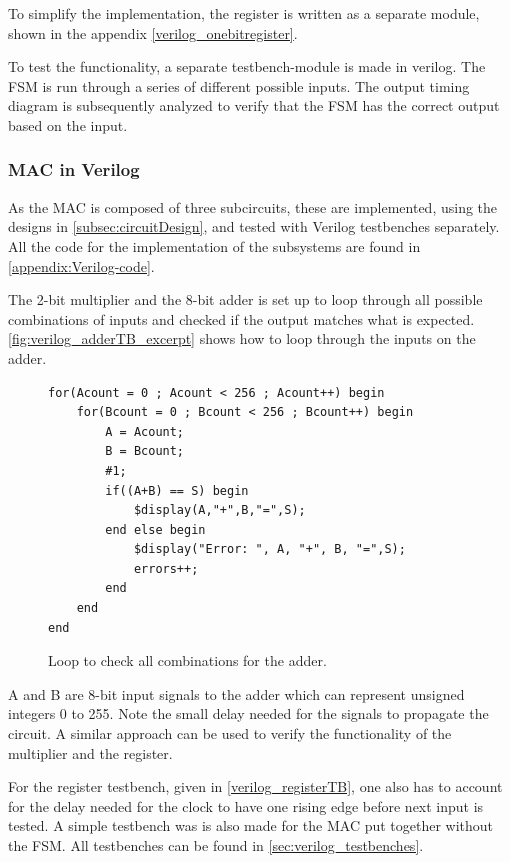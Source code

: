 To simplify the implementation, the register is written as a separate module, shown in the appendix \autoref{verilog_onebitregister}.

To test the functionality, a separate testbench-module is made in verilog. The FSM is run through a series of different possible inputs. The output timing diagram is subsequently analyzed to verify that the FSM has the correct output based on the input.

\subsubsection{MAC in Verilog}
\label{subsubsec:MAC_in_verilog}

As the MAC is composed of three subcircuits, these are implemented, using the designs in \autoref{subsec:circuitDesign}, and tested with Verilog testbenches separately. All the code for the implementation of the subsystems are found in \autoref{appendix:Verilog-code}. 

The 2-bit multiplier and the 8-bit adder is set up to loop through all possible combinations of inputs and checked if the output matches what is expected. \autoref{fig:verilog_adderTB_excerpt} shows how to loop through the inputs on the adder.

\begin{figure}[H]
\centering
\caption{Loop to check all combinations for the adder.}
\label{fig:verilog_adderTB_excerpt}
\begin{minipage}{0.8\textwidth}
\begin{lstlisting}[style=verilogStyle]
for(Acount = 0 ; Acount < 256 ; Acount++) begin
    for(Bcount = 0 ; Bcount < 256 ; Bcount++) begin
        A = Acount;
        B = Bcount;
        #1;
        if((A+B) == S) begin
            $display(A,"+",B,"=",S);
        end else begin
            $display("Error: ", A, "+", B, "=",S);
            errors++;
        end
    end
end
\end{lstlisting}
\end{minipage}
\end{figure}

A and B are 8-bit input signals to the adder which can represent unsigned integers 0 to 255. Note the small delay needed for the signals to propagate the circuit. A similar approach can be used to verify the functionality of the multiplier and the register. 

For the register testbench, given in \autoref{verilog_registerTB}, one also has to account for the delay needed for the clock to have one rising edge before next input is tested. A simple testbench was is also made for the MAC put together without the FSM. All testbenches can be found in \autoref{sec:verilog_testbenches}.

